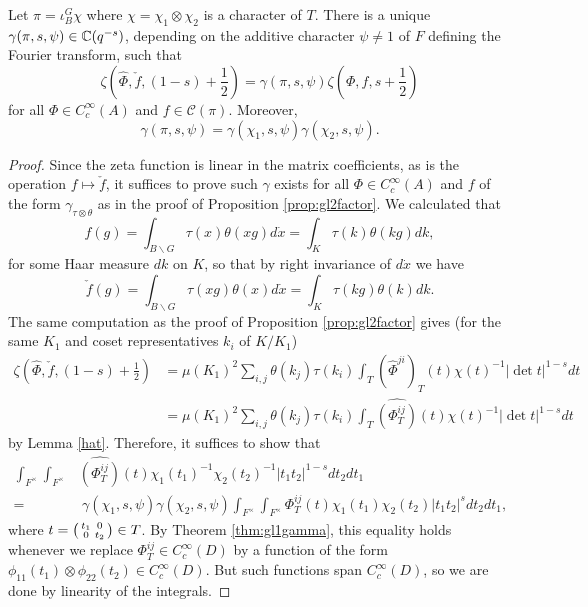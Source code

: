 \begin{prop}\label{prop:gl2gamma}
    Let $\pi = \iota_B^G \chi$ where $\chi=\chi_1\otimes \chi_2$ is a character of $T$. There is a unique $\gamma(\pi,s,\psi) \in \mathbb{C}(q^{-s})$, depending on the additive character $\psi \neq 1$ of $F$ defining the Fourier transform, such that 
    $$\zeta\left(\hat{\Phi},\check{f},(1-s)+\frac{1}{2}\right) = \gamma(\pi,s,\psi) \zeta\left(\Phi,f,s+\frac{1}{2}\right)$$
    for all $\Phi \in C_c^\infty(A)$ and $f \in \mathcal C(\pi)$. Moreover, 
    $$\gamma(\pi,s,\psi) = \gamma(\chi_1,s,\psi)\gamma(\chi_2,s,\psi).$$
\end{prop}
\begin{proof}
    Since the zeta function is linear in the matrix coefficients, as is the operation $f \mapsto \check{f}$, it suffices to prove such $\gamma$ exists for all $\Phi \in C_c^\infty(A)$ and $f$ of the form $\gamma_{\tau \otimes \theta}$ as in the proof of Proposition \ref{prop:gl2factor}. We calculated that 
    $$f(g) = \int_{B \backslash G} \tau(x)\theta(xg) d\dot{x} = \int_K \tau(k)\theta(kg)dk,$$ for some Haar measure $dk$ on $K$, so that by right invariance of $d\dot{x}$ we have 
    $$\check{f}(g) = \int_{B \backslash G}\tau(xg)\theta(x) d\dot{x} = \int_K \tau(kg)\theta(k)dk.$$ The same computation as the proof of Proposition \ref{prop:gl2factor} gives (for the same $K_1$ and coset representatives $k_i$ of $K/K_1$)
    \begin{equation*}
        \begin{split}
            \zeta\left(\hat{\Phi},\check{f},(1-s)+\frac{1}{2}\right) &= \mu(K_1)^2 \sum\limits_{i,j} \theta(k_j)\tau(k_i) \int_T (\hat\Phi^{ji})_T(t) \chi(t)^{-1} |\det t|^{1-s} dt \\
            &= \mu(K_1)^2 \sum\limits_{i,j} \theta(k_j)\tau(k_i) \int_T \widehat{(\Phi_T^{ij})}(t) \chi(t)^{-1} |\det t|^{1-s} dt
        \end{split}
    \end{equation*}
    by Lemma \ref{hat}. Therefore, it suffices to show that 
    \begin{align*}
        \int_{F^\times}\int_{F^\times}& \widehat{(\Phi^{ij}_T)}(t)\chi_1(t_1)^{-1}\chi_2(t_2)^{-1}|t_1t_2|^{1-s} dt_2dt_1 \\
        =&\ \gamma(\chi_1,s,\psi)\gamma(\chi_2,s,\psi) \int_{F^\times} \int_{F^\times}\Phi^{ij}_T(t)\chi_1(t_1)\chi_2(t_2) |t_1t_2|^s dt_2dt_1,
    \end{align*}
    where $t = \begin{psmallmatrix}
        t_1 &0\\0&t_2
    \end{psmallmatrix} \in T$. By Theorem \ref{thm:gl1gamma}, this equality holds whenever we replace $\Phi^{ij}_T \in C_c^\infty(D)$ by a function of the form $\phi_{11}(t_1) \otimes \phi_{22}(t_2) \in C_c^\infty(D)$. But such functions span $C_c^\infty(D)$, so we are done by linearity of the integrals.
\end{proof}

